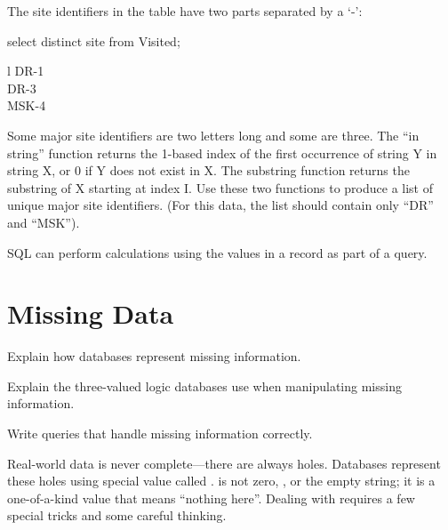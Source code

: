 \begin{challenge}
  The site identifiers in the  table have two parts
  separated by a `-':

\begin{VerbIn}
select distinct site from Visited;
\end{VerbIn}

\begin{sqltable}{l}
DR-1 \\
DR-3 \\
MSK-4 \\
\end{sqltable}

Some major site identifiers are two letters long and some are three. The
``in string'' function  returns the 1-based index of
the first occurrence of string Y in string X, or 0 if Y does not exist
in X. The substring function  returns the substring
of X starting at index I. Use these two functions to produce a list of
unique major site identifiers. (For this data, the list should contain
only ``DR'' and ``MSK'').
\end{challenge}

\begin{keypoints}
\begin{swcitemize}
\item
  SQL can perform calculations using the values in a record as part of a
  query.
\end{swcitemize}
\end{keypoints}

\section{Missing Data}

\begin{objectives}
\begin{swcitemize}
\item
  Explain how databases represent missing information.
\item
  Explain the three-valued logic databases use when manipulating missing
  information.
\item
  Write queries that handle missing information correctly.
\end{swcitemize}
\end{objectives}

Real-world data is never complete---there are always holes. Databases
represent these holes using special value called .
 is not zero, , or the empty string; it is a
one-of-a-kind value that means ``nothing here''. Dealing with
 requires a few special tricks and some careful thinking.

